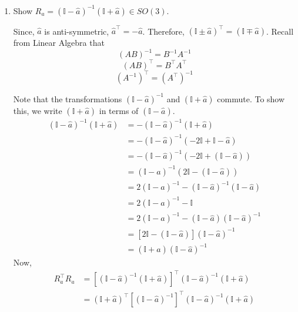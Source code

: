 \documentclass[12pt]{article}
\newcommand{\I}{\mathbb{I}}
\begin{document}
\begin{enumerate}
            \begin{enumerate}
                \item Show $R_a = (\I - \widehat{a})^{-1}(\I + \widehat{a}) \in SO(3)$. 
                
                    Since, $\widehat{a}$ is anti-symmetric, $\widehat{a} ^\top = - \widehat{a} $. Therefore, $(\I \pm \widehat{a})^\top = (\I \mp \widehat{a})$. Recall from Linear Algebra that \[(AB)^{-1}=B^{-1}A^{-1}\] \[ (AB)^{\top}=B^{\top}A^{\top} \]  \[ (A^{-1})^{\top} = (A^{\top})^{-1}\]
                    
                    Note that the transformations $(\I - \widehat{a})^{-1}$ and $(\I + \widehat{a})$ commute. To show this, we write $(\I + \widehat{a})$ in terms of $(\I - \widehat{a})$.
                    \begin{align*}
                        (\I - \widehat{a})^{-1}(\I + \widehat{a}) &= - (\I - \widehat{a})^{-1} (\I + \widehat{a}) \\
                                                        &= - (\I - \widehat{a})^{-1} (-2\I + \I - \widehat{a})\\
                                                        &= -  (\I - \widehat{a})^{-1} (-2\I + (\I - \widehat{a}))\\
                                                        &=  (\I - \widehat{a})^{-1} (2\I - (\I - \widehat{a}))\\
                                                        &= 2(\I - \widehat{a})^{-1} - (\I - \widehat{a})^{-1} (\I - \widehat{a})\\
                                                        &= 2(\I - \widehat{a})^{-1} - \I \\
                                                        &= 2(\I - \widehat{a})^{-1} - (\I - \widehat{a}) (\I - \widehat{a})^{-1}\\
                                                        &= [2 \I - (\I - \widehat{a})] (\I - \widehat{a})^{-1} \\
                                                        &= (\I + \widehat{a}) (\I - \widehat{a})^{-1}
                    \end{align*}
                    Now,     
                    \begin{align}
                        R_a^{\top} R_a &= [(\I - \widehat{a})^{-1}(\I + \widehat{a})]^{\top}(\I - \widehat{a})^{-1}(\I + \widehat{a}) \\
                                        &= (\I + \widehat{a})^{\top}[(\I - \widehat{a})^{-1}]^{\top}(\I - \widehat{a})^{-1}(\I + \widehat{a}) \\

\end{align}
\end{enumerate}
\end{enumerate}
\end{document}
